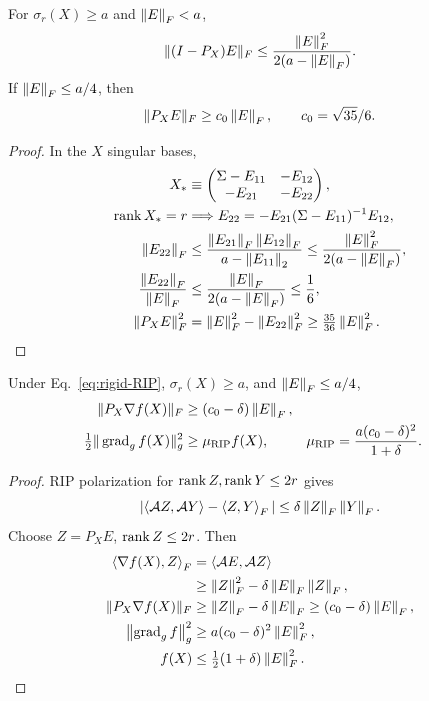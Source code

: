 \begin{lemma}
For $\sigma_r(X)\geq a$ and $\nn E<a$,
\begin{equation}
\|(I-P_X)E\|_F
\leq\frac{\nn E^2}{2(a-\nn E)} .
\label{eq:rigid-normal-error}
\end{equation}
If $\nn E\leq a/4$, then
\begin{equation}
\|P_XE\|_F\geq c_0\nn E,\qquad c_0=\sqrt{35}/6 .
\end{equation}
\end{lemma}
\begin{proof}
In the $X$ singular bases,
\begin{align}
X_*&\equiv
\begin{pmatrix}\Sigma-E_{11}&-E_{12}\\-E_{21}&-E_{22}\end{pmatrix},\\
\rnk X_*=r&\Longrightarrow
E_{22}=-E_{21}(\Sigma-E_{11})^{-1}E_{12},\\
\nn{E_{22}}
&\leq\frac{\nn{E_{21}}\nn{E_{12}}}{a-\on{E_{11}}}
\leq\frac{\nn E^2}{2(a-\nn E)},\\
\frac{\nn{E_{22}}}{\nn E}
&\leq\frac{\nn E}{2(a-\nn E)}\leq\frac16,\\
\nn{P_XE}^2&=\nn E^2-\nn{E_{22}}^2
\geq\tfrac{35}{36}\nn E^2 .
\end{align}
\end{proof}

\begin{theorem}
\label{thm:rigid-rip-pl}
Under Eq.~\eqref{eq:rigid-RIP}, $\sigma_r(X)\geq a$, and $\nn E\leq a/4$,
\begin{align}
\|P_X\nabla f(X)\|_F&\geq(c_0-\delta)\nn E,\\
\tfrac12\|\qgrad_g f(X)\|_g^2
&\geq\mu_{\rm RIP} f(X),&
\mu_{\rm RIP}&=\frac{a(c_0-\delta)^2}{1+\delta}.
\label{eq:rigid-rip-pl}
\end{align}
\end{theorem}
\begin{proof}
RIP polarization for $\rnk Z,\rnk Y\leq2r$ gives
\begin{equation}
|\langle\mathcal AZ,\mathcal AY\rangle-\ii ZY|
\leq\delta\nn Z\nn Y .
\end{equation}
Choose $Z=P_XE$, $\rnk Z\leq2r$. Then
\begin{align}
\ii{\nabla f(X)}Z
&=\langle\mathcal AE,\mathcal AZ\rangle\\
&\geq\nn Z^2-\delta\nn E\nn Z,\\
\|P_X\nabla f(X)\|_F
&\geq\nn Z-\delta\nn E\geq(c_0-\delta)\nn E,\\
\gn{\qgrad_g f}^2&\geq a(c_0-\delta)^2\nn E^2,\\
f(X)&\leq\tfrac12(1+\delta)\nn E^2 .
\end{align}
\end{proof}



